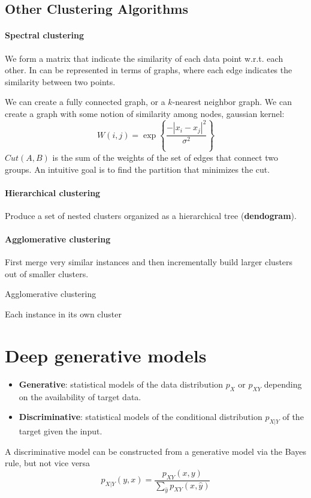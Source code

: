 \documentclass[a4paper,6pt,twocolumn,fleqn]{article}
\begin{document}
\subsection{Other Clustering Algorithms} %
\paragraph{Spectral clustering}
We form a matrix that indicate the similarity of each data point w.r.t. each other. In can be represented in terms of graphs, where each edge indicates the similarity between two points.

We can create a fully connected graph, or a \(k\)-nearest neighbor graph. We can create a graph with some notion of similarity among nodes, gaussian kernel:
\begin{equation}
    W(i,j) = \exp \left\{ \frac {-|x_i - x_j|^2} {\sigma^2} \right\}
\end{equation}
\(Cut(A,B)\) is the sum of the weights of the set of edges that connect two groups. An intuitive goal is to find the partition that minimizes the cut.
\paragraph{Hierarchical clustering}
Produce a set of nested clusters organized as a hierarchical tree (\textbf{dendogram}).
\paragraph{Agglomerative clustering} First merge very similar instances and then incrementally build larger clusters out of smaller clusters.
\begin{algorithm}
    \caption{Agglomerative clustering}
    Each instance in its own cluster\;
\end{algorithm}

\section{Deep generative models}
\begin{itemize}
    \item \textbf{Generative}: statistical models of the data distribution \(p_X\) or \(p_{XY}\) depending on the availability of target data.
    \item \textbf{Discriminative}: statistical models of the conditional distribution \(p_{X|Y}\) of the target given the input. 
\end{itemize}
A discriminative model can be constructed from a generative model via the Bayes rule, but not vice versa
\begin{equation}
    p_{X|Y} (y,x) = \frac {p_{XY}(x,y)} {\sum_{\hat y} p_{XY} (x, \hat y)}
\end{equation}
\end{document}
